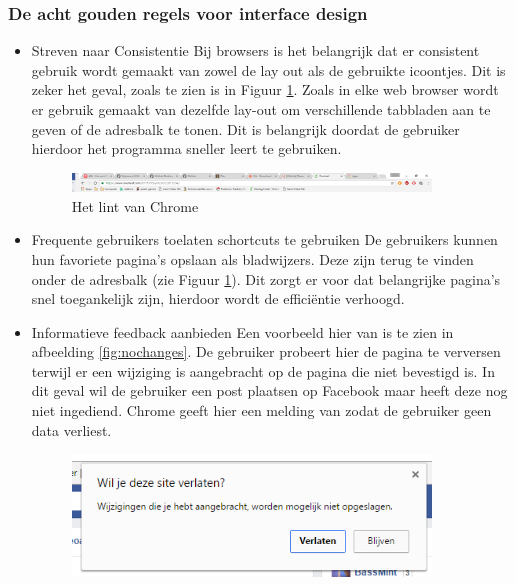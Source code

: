 \documentclass[11pt]{article}
\begin{document}
\subsubsection{De acht gouden regels voor interface design}
\begin{itemize}
\item Streven naar Consistentie
\newline
Bij browsers is het belangrijk dat er consistent gebruik wordt gemaakt van zowel de lay out als de gebruikte icoontjes. Dit is zeker het geval, zoals te zien is in Figuur \ref{fig:tabsChrome}. Zoals in elke web browser wordt er gebruik gemaakt van dezelfde lay-out om verschillende tabbladen aan te geven of de adresbalk te tonen. Dit is belangrijk doordat de gebruiker hierdoor het programma sneller leert te gebruiken.
\begin{figure}
  \centering
    \includegraphics[width=0.9\textwidth]{Tabs_Chrome.png}
  \caption{Het lint van Chrome}
  \label{fig:tabsChrome}
\end{figure}
\item Frequente gebruikers toelaten schortcuts te gebruiken
\newline
De gebruikers kunnen hun favoriete pagina's opslaan als bladwijzers. Deze zijn terug te vinden onder de adresbalk (zie Figuur \ref{fig:tabsChrome}). Dit zorgt er voor dat belangrijke pagina's snel toegankelijk zijn, hierdoor wordt de efficiëntie verhoogd.
\item Informatieve feedback aanbieden
\newline
Een voorbeeld hier van is te zien in afbeelding \ref{fig:nochanges}. De gebruiker probeert hier de pagina te verversen terwijl er een wijziging is aangebracht op de pagina die niet bevestigd is. In dit geval wil de gebruiker een post plaatsen op Facebook maar heeft deze nog niet ingediend. Chrome geeft hier een melding van zodat de gebruiker geen data verliest.
\begin{figure}
  \centering
    \includegraphics[width=0.9\textwidth]{No_Changes.png}

\end{figure}
\end{itemize}
\end{document}
